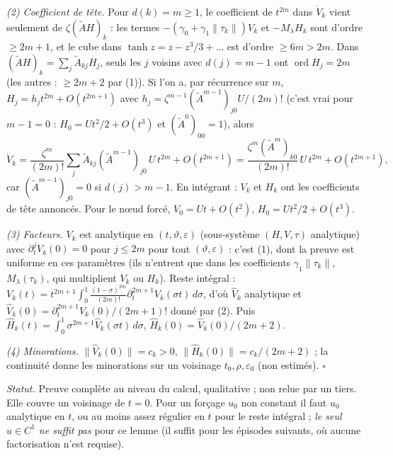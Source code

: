 \documentclass[11pt,a4paper]{article}
\theoremstyle{remark}
\newcommand{\vth}{\vartheta}
\begin{document}
\emph{(2) Coefficient de t\^ete.} Pour $d(k)=m\ge1$, le coefficient de $t^{2m}$ dans $\dot V_k$ vient seulement de $\zeta(\tilde AH)_k$ : les termes $-(\gamma_0+\gamma_1\lVert\tau_k\rVert)V_k$ et $-M_\lambda H_k$ sont d'ordre $\ge2m+1$, et le cube dans $\tanh z=z-z^3/3+\dots$ est d'ordre $\ge6m>2m$. Dans $(\tilde AH)_k=\sum_j\tilde A_{kj}H_j$, seuls les $j$ voisins avec $d(j)=m-1$ ont $\operatorname{ord}H_j=2m$ (les autres : $\ge2m+2$ par (1)). Si l'on a, par r\'ecurrence sur $m$, $H_j=h_jt^{2m}+O(t^{2m+1})$ avec $h_j=\zeta^{m-1}(\tilde A^{m-1})_{j0}U/(2m)!$ (c'est vrai pour $m-1=0$ : $H_0=Ut^2/2+O(t^3)$ et $(\tilde A^0)_{00}=1$), alors
\[ \dot V_k=\frac{\zeta^m}{(2m)!}\sum_j\tilde A_{kj}(\tilde A^{m-1})_{j0}\,U\,t^{2m}+O(t^{2m+1})=\frac{\zeta^m(\tilde A^m)_{k0}}{(2m)!}\,U\,t^{2m}+O(t^{2m+1}), \]
car $(\tilde A^{m-1})_{j0}=0$ si $d(j)>m-1$. En int\'egrant : $V_k$ et $H_k$ ont les coefficients de t\^ete annonc\'es. Pour le n\oe ud forc\'e, $V_0=Ut+O(t^2)$, $H_0=Ut^2/2+O(t^3)$.

\emph{(3) Facteurs.} $V_k$ est analytique en $(t,\vth,\varepsilon)$ (sous-syst\`eme $(H,V,\tau)$ analytique) avec $\partial_t^jV_k(0)=0$ pour $j\le2m$ pour tout $(\vth,\varepsilon)$ : c'est (1), dont la preuve est uniforme en ces param\`etres (ils n'entrent que dans les coefficients $\gamma_1\lVert\tau_k\rVert$, $M_\lambda(\tau_k)$, qui multiplient $V_k$ ou $H_k$). Reste int\'egral : $V_k(t)=t^{2m+1}\int_0^1\frac{(1-\sigma)^{2m}}{(2m)!}\partial_t^{2m+1}V_k(\sigma t)\,d\sigma$, d'o\`u $\hat V_k$ analytique et $\hat V_k(0)=\partial_t^{2m+1}V_k(0)/(2m+1)!$ donn\'e par (2). Puis $\hat H_k(t)=\int_0^1\sigma^{2m+1}\hat V_k(\sigma t)\,d\sigma$, $\hat H_k(0)=\hat V_k(0)/(2m+2)$.

\emph{(4) Minorations.} $\lVert\hat V_k(0)\rVert=c_k>0$, $\lVert\hat H_k(0)\rVert=c_k/(2m+2)$ ; la continuit\'e donne les minorations sur un voisinage $t_0,\rho,\varepsilon_0$ (non estim\'es). $\square$

\noindent\emph{Statut.} Preuve compl\`ete au niveau du calcul, qualitative ; non relue par un tiers. Elle couvre un voisinage de $t=0$. Pour un for\c{c}age $u_0$ non constant il faut $u_0$ analytique en $t$, ou au moins assez r\'egulier en $t$ pour le reste int\'egral ; \emph{le seul $u\in C^1$ ne suffit pas} pour ce lemme (il suffit pour les \'episodes suivants, o\`u aucune factorisation n'est requise).
\end{document}
